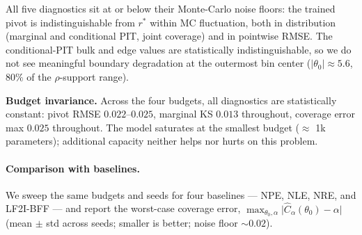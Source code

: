 \documentclass[11pt]{article}
\begin{document}
All five diagnostics sit at or below their Monte-Carlo noise floors:
the trained pivot is indistinguishable from \(r^*\) within MC
fluctuation, both in distribution (marginal and conditional PIT, joint
coverage) and in pointwise RMSE. The conditional-PIT bulk and edge
values are statistically indistinguishable, so we do not see
meaningful boundary degradation at the outermost bin center
(\(|\theta_0| \approx 5.6\), \(80\%\) of the \(\rho\)-support range).

\textbf{Budget invariance.} Across the four budgets, all diagnostics
are statistically constant: pivot RMSE \(0.022\)--\(0.025\), marginal
KS \(0.013\) throughout, coverage error max \(0.025\) throughout. The
model saturates at the smallest budget (\(\approx\) 1k parameters);
additional capacity neither helps nor hurts on this problem.

\paragraph{Comparison with baselines.} We sweep the same budgets and
seeds for four baselines --- NPE, NLE, NRE, and LF2I-BFF --- and
report the worst-case coverage error,
\(\max_{\theta_0, \alpha} \bigl| \hat{C}_\alpha(\theta_0) - \alpha \bigr|\)
(mean \(\pm\) std across seeds; smaller is better; noise floor
\(\sim 0.02\)).
\end{document}
